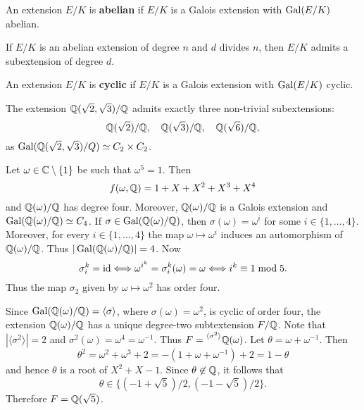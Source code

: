 \begin{definition}
    An extension $E/K$ is \textbf{abelian} if $E/K$ is a Galois extension
    with $\operatorname{Gal}(E/K)$ abelian.
\end{definition}

\begin{exercise}
    If $E/K$ is an abelian extension of degree $n$ and $d$ divides
    $n$, then $E/K$ admits a subextension of degree $d$. 
\end{exercise}

\begin{definition}
    An extension $E/K$ is \textbf{cyclic} if $E/K$ is 
    a Galois extension with $\operatorname{Gal}(E/K)$ cyclic. 
\end{definition}

\begin{example}
    The extension $\mathbb{Q}(\sqrt{2},\sqrt{3})/\mathbb{Q}$ admits
    exactly three non-trivial subextensions: 
    \[
    \mathbb{Q}(\sqrt{2})/\mathbb{Q},
    \quad
    \mathbb{Q}(\sqrt{3})/\mathbb{Q},
    \quad 
    \mathbb{Q}(\sqrt{6})/\mathbb{Q},
    \]
    as $\operatorname{Gal}(\mathbb{Q}(\sqrt{2},\sqrt{3})/Q)\simeq C_2\times C_2$. 
\end{example}

\begin{example}
    Let $\omega\in\mathbb{C}\setminus\{1\}$ be such that $\omega^5=1$.
    Then 
    \[
    f(\omega,\mathbb{Q})=1+X+X^2+X^3+X^4
    \]
    and $\mathbb{Q}(\omega)/\mathbb{Q}$ has
    degree four. 
    Moreover, $\mathbb{Q}(\omega)/\mathbb{Q}$ is a Galois extension
    and 
    $\operatorname{Gal}(\mathbb{Q}(\omega)/\mathbb{Q})\simeq C_4$. If $\sigma\in \operatorname{Gal}(\mathbb{Q}(\omega)/\mathbb{Q})$,
    then $\sigma(\omega)=\omega^i$ for some $i\in\{1,\dots,4\}$. 
    Moreover, for every $i\in\{1,\dots,4\}$ 
    the map $\omega\mapsto\omega^i$ induces an automorphism
    of $\mathbb{Q}(\omega)/\mathbb{Q}$. Thus $|\operatorname{Gal}(\mathbb{Q}(\omega)/\mathbb{Q})|=4$. Now 
    \[
    \sigma_i^k=\operatorname{id}\Longleftrightarrow
    \omega^{i^k}=\sigma_i^k(\omega)=\omega\Longleftrightarrow
    i^k\equiv1\bmod 5.
    \]
    Thus the map $\sigma_2$ given 
    by $\omega\mapsto\omega^2$ has order four. 
    
    Since $\operatorname{Gal}(\mathbb{Q}(\omega)/\mathbb{Q})=\langle\sigma\rangle$,
    where $\sigma(\omega)=\omega^2$, 
    is cyclic of order four, 
    the extension $\mathbb{Q}(\omega)/\mathbb{Q}$ has a unique degree-two 
    subtextension $F/\mathbb{Q}$. Note that $|\langle\sigma^2\rangle|=2$ 
    and $\sigma^2(\omega)=\omega^4=\omega^{-1}$. Thus 
    $F=\prescript{\langle\sigma^2\rangle}{}{\mathbb{Q}(\omega)}$. Let 
    $\theta=\omega+\omega^{-1}$. Then 
    \[
    \theta^2=\omega^2+\omega^3+2=-(1+\omega+\omega^{-1})+2=1-\theta
    \]
    and hence $\theta$ is a root of $X^2+X-1$. Since $\theta\not\in\mathbb{Q}$, 
    it follows that 
    \[
    \theta\in\{(-1+\sqrt{5})/2,(-1-\sqrt{5})/2\}.
    \]
    Therefore
    $F=\mathbb{Q}(\sqrt{5})$. 
\end{example}

